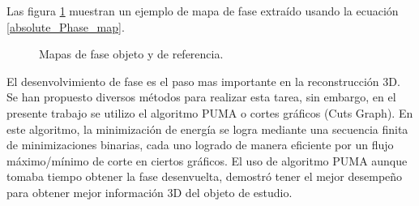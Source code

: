 \documentclass[10pt,letterpaper]{article}
\begin{document}
Las figura \ref{tif1213} muestran un ejemplo de mapa de fase extraído usando la ecuación \ref{absolute_Phase_map}.

\begin{figure}[H]
      \begin{center}
        \caption{Mapas de fase objeto y de referencia.}
        \label{tif1213}
      \end{center}
    \end{figure}
    
El desenvolvimiento de fase es el paso mas importante en la reconstrucción 3D. Se han propuesto diversos métodos para realizar esta tarea, sin embargo, en el presente trabajo se utilizo el algoritmo PUMA o cortes gráficos (Cuts Graph)\cite{Biou:Vala}. En este algoritmo, la minimización de energía se logra mediante una secuencia finita de minimizaciones binarias, cada uno logrado de manera eficiente por un flujo máximo/mínimo de corte en ciertos gráficos. El uso de algoritmo PUMA aunque tomaba tiempo obtener la fase desenvuelta, demostró tener el mejor desempeño para obtener mejor información 3D del objeto de estudio. %
\end{document}
